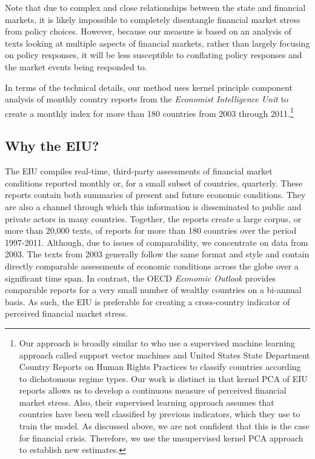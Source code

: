\documentclass[]{article}
\begin{document}
Note that due to complex and close relationships between the state and financial markets, it is likely impossible to completely disentangle financial market stress from policy choices. However, because our measure is based on an analysis of texts looking at multiple aspects of financial markets, rather than largely focusing on policy responses, it will be less susceptible to conflating policy responses and the market events being responded to.

In terms of the technical details, our method uses kernel principle component analysis \citep{Scholkopf1998,lodhi2002,Spirling2012} of monthly country reports from the \emph{Economist Intelligence Unit} to create a monthly index for more than 180 countries from 2003 through 2011.\footnote{Our approach is broadly similar to \cite{Minhas2015} who use a supervised machine learning approach called support vector machines and United States State Department Country Reports on Human Rights Practices to classify countries according to dichotomous regime types. Our work is distinct in that kernel PCA of EIU reports allows us to develop a continuous measure of perceived financial market stress. Also, their supervised learning approach assumes that countries have been well classified by previous indicators, which they use to train the model. As discussed above, we are not confident that this is the case for financial crisis. Therefore, we use the unsupervised kernel PCA approach to establish new estimates.}

\subsection{Why the EIU?}\label{why-the-eiu}

The EIU compiles real-time, third-party assessments of financial market conditions reported monthly or, for a small subset of countries, quarterly. These reports contain both summaries of present and future economic conditions. They are also a channel through which this information is disseminated to public and private actors in many countries. Together, the reports create a large corpus, or more than 20,000 texts,  of reports for more than 180 countries over the period 1997-2011. Although, due to issues of comparability, we concentrate on data from 2003. The texts from 2003 generally follow the same format and style and contain directly comparable assessments of economic conditions across the globe over a significant time span. In contrast, the OECD \emph{Economic Outlook} provides comparable reports for a very small number of wealthy countries on a bi-annual basis. As such, the EIU is preferable for creating a cross-country indicator of perceived financial market stress.
\end{document}

